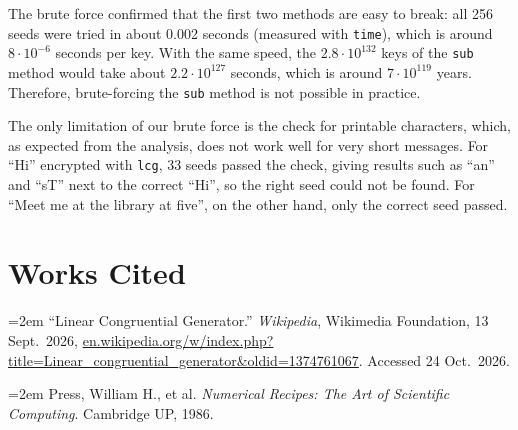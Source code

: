 \documentclass[a4paper,10pt]{article}
\begin{document}
The brute force confirmed that the first two methods are easy to break: all 256 seeds were tried in about 0.002 seconds (measured with {\tt time}), which is around $8 \cdot 10^{-6}$ seconds per key. With the same speed, the $2.8 \cdot 10^{132}$ keys of the {\tt sub} method would take about $2.2 \cdot 10^{127}$ seconds, which is around $7 \cdot 10^{119}$ years. Therefore, brute-forcing the {\tt sub} method is not possible in practice.

The only limitation of our brute force is the check for printable characters, which, as expected from the analysis, does not work well for very short messages. For ``Hi'' encrypted with {\tt lcg}, 33 seeds passed the check, giving results such as ``an'' and ``sT'' next to the correct ``Hi'', so the right seed could not be found. For ``Meet me at the library at five'', on the other hand, only the correct seed passed.

\section*{Works Cited}
\raggedright
\noindent\hangindent=2em ``Linear Congruential Generator.'' \emph{Wikipedia}, Wikimedia Foundation, 13 Sept.\ 2026, \url{en.wikipedia.org/w/index.php?title=Linear_congruential_generator&oldid=1374761067}. Accessed 24 Oct.\ 2026.

\noindent\hangindent=2em Press, William H., et al. \emph{Numerical Recipes: The Art of Scientific Computing}. Cambridge UP, 1986.
 
\end{document}
